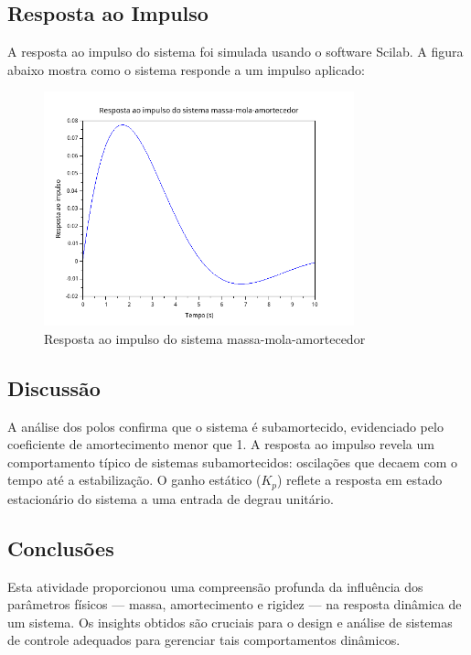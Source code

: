 \subsection{Resposta ao Impulso}
A resposta ao impulso do sistema foi simulada usando o software Scilab. A figura abaixo mostra como o sistema responde a um impulso aplicado:
\begin{figure}[H]
    \centering
    \includegraphics[width=0.8\textwidth]{3-atividade/assets/resposta-ao-impulso.png}
    \caption{Resposta ao impulso do sistema massa-mola-amortecedor}
\end{figure}

\subsection{Discussão}
A análise dos polos confirma que o sistema é subamortecido, evidenciado pelo coeficiente de amortecimento menor que 1. A resposta ao impulso revela um comportamento típico de sistemas subamortecidos: oscilações que decaem com o tempo até a estabilização. O ganho estático (\( K_p \)) reflete a resposta em estado estacionário do sistema a uma entrada de degrau unitário.

\subsection{Conclusões}
Esta atividade proporcionou uma compreensão profunda da influência dos parâmetros físicos — massa, amortecimento e rigidez — na resposta dinâmica de um sistema. Os insights obtidos são cruciais para o design e análise de sistemas de controle adequados para gerenciar tais comportamentos dinâmicos.

